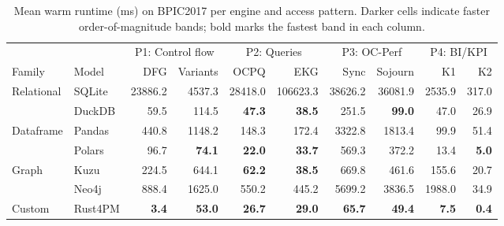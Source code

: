 \begin{table}[t]
\caption{Mean warm runtime (ms) on BPIC2017 per engine and access pattern. Darker cells indicate faster order-of-magnitude bands; bold marks the fastest band in each column.}\label{tab:main-results}
\centering
\footnotesize
\setlength{\tabcolsep}{2pt}
\renewcommand{\arraystretch}{1.15}
\begin{tabular*}{\linewidth}{@{\extracolsep{\fill}}llrrrrrrrr@{}}
\toprule
 &  & \multicolumn{2}{c}{P1: Control flow} & \multicolumn{2}{c}{P2: Queries} & \multicolumn{2}{c}{P3: OC-Perf} & \multicolumn{2}{c}{P4: BI/KPI} \\
\cmidrule(lr){3-4} \cmidrule(lr){5-6} \cmidrule(lr){7-8} \cmidrule(lr){9-10}
Family & Model & DFG & Variants & OCPQ & EKG & Sync & Sojourn & K1 & K2 \\
\midrule
\multirow{2}{*}{Relational} & SQLite & \cellcolor{teal!5}23886.2 & \cellcolor{teal!5}4537.3 & \cellcolor{teal!5}28418.0 & \cellcolor{teal!5}106623.3 & \cellcolor{teal!5}38626.2 & \cellcolor{teal!5}36081.9 & \cellcolor{teal!5}2535.9 & \cellcolor{teal!20}317.0 \\
 & DuckDB & \cellcolor{teal!40}59.5 & \cellcolor{teal!20}114.5 & \cellcolor{teal!40}\textbf{47.3} & \cellcolor{teal!40}\textbf{38.5} & \cellcolor{teal!20}251.5 & \cellcolor{teal!40}\textbf{99.0} & \cellcolor{teal!40}47.0 & \cellcolor{teal!40}26.9 \\
\midrule
\multirow{2}{*}{Dataframe} & Pandas & \cellcolor{teal!20}440.8 & \cellcolor{teal!5}1148.2 & \cellcolor{teal!20}148.3 & \cellcolor{teal!20}172.4 & \cellcolor{teal!5}3322.8 & \cellcolor{teal!5}1813.4 & \cellcolor{teal!40}99.9 & \cellcolor{teal!40}51.4 \\
 & Polars & \cellcolor{teal!40}96.7 & \cellcolor{teal!40}\textbf{74.1} & \cellcolor{teal!40}\textbf{22.0} & \cellcolor{teal!40}\textbf{33.7} & \cellcolor{teal!20}569.3 & \cellcolor{teal!20}372.2 & \cellcolor{teal!40}13.4 & \cellcolor{teal!60}\textbf{5.0} \\
\midrule
\multirow{2}{*}{Graph} & Kuzu & \cellcolor{teal!20}224.5 & \cellcolor{teal!20}644.1 & \cellcolor{teal!40}\textbf{62.2} & \cellcolor{teal!40}\textbf{38.5} & \cellcolor{teal!20}669.8 & \cellcolor{teal!20}461.6 & \cellcolor{teal!20}155.6 & \cellcolor{teal!40}20.7 \\
 & Neo4j & \cellcolor{teal!20}888.4 & \cellcolor{teal!5}1625.0 & \cellcolor{teal!20}550.2 & \cellcolor{teal!20}445.2 & \cellcolor{teal!5}5699.2 & \cellcolor{teal!5}3836.5 & \cellcolor{teal!5}1988.0 & \cellcolor{teal!40}34.9 \\
\midrule
Custom & Rust4PM & \cellcolor{teal!60}\textbf{3.4} & \cellcolor{teal!40}\textbf{53.0} & \cellcolor{teal!40}\textbf{26.7} & \cellcolor{teal!40}\textbf{29.0} & \cellcolor{teal!40}\textbf{65.7} & \cellcolor{teal!40}\textbf{49.4} & \cellcolor{teal!60}\textbf{7.5} & \cellcolor{teal!60}\textbf{0.4} \\
\bottomrule
\end{tabular*}
\end{table}
